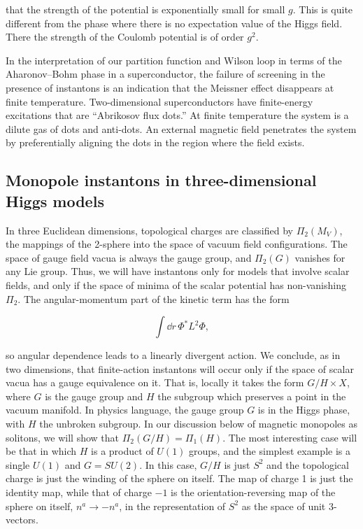 that the strength of the potential is exponentially small for small $g$. This is
quite different from the phase where there is no expectation value of the Higgs
field. There the strength of the Coulomb potential is of order $g^2$.

In the interpretation of our partition function and Wilson loop in terms of the
Aharonov--Bohm phase in a superconductor, the failure of screening in the
presence of instantons is an indication that the Meissner effect disappears at
finite temperature. Two-dimensional superconductors have finite-energy
excitations that are ``Abrikosov flux dots.'' At finite temperature the system is
a dilute gas of dots and anti-dots. An external magnetic field penetrates the
system by preferentially aligning the dots in the region where the field exists.

\subsection{Monopole instantons in three-dimensional Higgs models}

In three Euclidean dimensions, topological charges are classified by
$\Pi_2(M_V)$, the mappings of the 2-sphere into the space of vacuum field
configurations. The space of gauge field vacua is always the gauge group, and
$\Pi_2(G)$ vanishes for any Lie group. Thus, we will have instantons only for
models that involve scalar fields, and only if the space of minima of the scalar
potential has non-vanishing $\Pi_2$. The angular-momentum part of the kinetic
term has the form

\[
  \int\dd r\,\Phi^*L^2\Phi,
\]

so angular dependence leads to a linearly divergent action. We conclude, as in
two dimensions, that finite-action instantons will occur only if the space of
scalar vacua has a gauge equivalence on it. That is, locally it takes the form
$G/H\times X$, where $G$ is the gauge group and $H$ the subgroup which
preserves a point in the vacuum manifold. In physics language, the gauge group
$G$ is in the Higgs phase, with $H$ the unbroken subgroup. In our discussion
below of magnetic monopoles as solitons, we will show that
$\Pi_2(G/H)=\Pi_1(H)$. The most interesting case will be that in which $H$ is a
product of $U(1)$ groups, and the simplest example is a single $U(1)$ and
$G=SU(2)$. In this case, $G/H$ is just $S^2$ and the topological charge is just
the winding of the sphere on itself. The map of charge 1 is just the identity
map, while that of charge $-1$ is the orientation-reversing map of the sphere on
itself, $n^a\to-n^a$, in the representation of $S^2$ as the space of unit
3-vectors.

